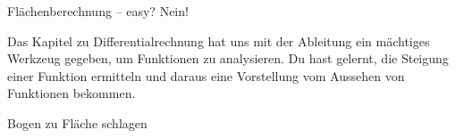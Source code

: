 \documentclass[../../main.tex]{subfiles}
\begin{document}
Flächenberechnung -- easy? Nein!

\begin{example}
    
\end{example}

Das Kapitel zu Differentialrechnung hat uns mit der Ableitung ein mächtiges Werkzeug gegeben, um Funktionen zu analysieren. Du hast gelernt, die Steigung einer Funktion ermitteln und daraus eine Vorstellung vom Aussehen von Funktionen bekommen.

Bogen zu Fläche schlagen
\end{document}

